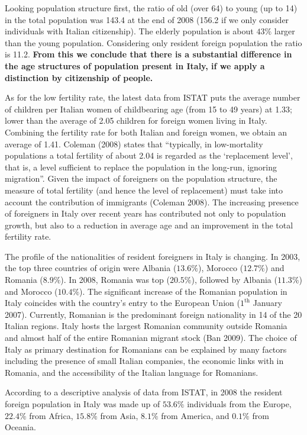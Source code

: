 \documentclass[10pt] {article}
\theoremstyle{definition}
\theoremstyle{plain}
\begin{document}
Looking population structure first, the ratio of old (over 64) to young (up to 14) in the total population was 143.4 at the end of 2008 (156.2 if we only consider individuals with Italian citizenship). The elderly population is about $43\%$ larger than the young population. Considering only resident foreign population the ratio is 11.2. \textbf{From this we conclude that there is a substantial difference in the age structures of population present in Italy, if we apply a distinction by citizenship of people.}

As for the low fertility rate, the latest data from ISTAT puts the average number of children per Italian women of childbearing age (from 15 to 49 years) at 1.33; lower than the average of 2.05 children for foreign women living in Italy. Combining the fertility rate for both Italian and foreign women, we obtain an average of 1.41. Coleman (2008) states that ``typically, in low-mortality populations a total fertility of about 2.04 is regarded as the `replacement level', that is, a level sufficient to replace the population in the long-run, ignoring migration''. Given the impact of foreigners on the population structure, the measure of total fertility (and hence the level of replacement) must take into account the contribution of immigrants (Coleman 2008). The increasing presence of foreigners in Italy over recent years has contributed not only to population growth, but also to a reduction in average age and an improvement in the total fertility rate.

The profile of the nationalities of resident foreigners in Italy is changing. In 2003, the top three countries of origin were Albania ($13.6\%$), Morocco ($12.7\%$) and Romania ($8.9\%$). In 2008, Romania was top ($20.5\%$), followed by Albania ($11.3\%$) and Morocco ($10.4\%$). The significant increase of the Romanian population in Italy coincides with the country's entry to the European Union ($1^\text{th}$ January 2007). Currently, Romanian is the predominant foreign nationality in 14 of the 20 Italian regions. Italy hosts the largest Romanian community outside Romania and almost half of the entire Romanian migrant stock (Ban 2009). The choice of Italy as primary destination for Romanians can be explained by many factors including the presence of small Italian companies, the economic links with in Romania, and the accessibility of the Italian language for Romanians. 

According to a descriptive analysis of data from ISTAT, in 2008 the resident foreign population in Italy was made up of $53.6\%$ individuals from the Europe, $22.4\%$ from Africa, $15.8\%$ from Asia, $8.1\%$ from America, and $0.1\%$ from Oceania.
\end{document}

